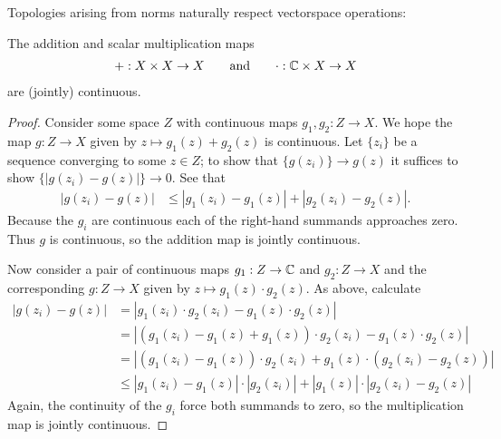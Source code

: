       Topologies arising from norms naturally respect vectorspace operations:
      \begin{claim}
        The addition and scalar multiplication maps 
        \begin{align*}
          +:X\times X\rightarrow X
          \qquad\text{and}\qquad
          \cdot:\mathbb{C}\times X\rightarrow X
        \end{align*}
        are (jointly) continuous.\footnotemark
      \end{claim}
      \begin{proof}
        Consider some space $Z$ with continuous maps $g_1,g_2:Z\rightarrow X$.
        We hope the map $g:Z\rightarrow X$ given by $z\mapsto g_1(z)+g_2(z)$ is continuous.
        Let $\{z_i\}$ be a sequence converging to some $z\in Z$; to show that $\{g(z_i)\}\rightarrow g(z)$ it suffices to show $\{|g(z_i)-g(z)|\}\rightarrow0$.
        See that 
        \begin{align*}
          |g(z_i)-g(z)|
          &\le |g_1(z_i) - g_1(z)| + |g_2(z_i) - g_2(z)|\text{.}
        \end{align*}
        Because the $g_i$ are continuous each of the right-hand summands approaches zero.
        Thus $g$ is continuous, so the addition map is jointly continuous.

        Now consider a pair of continuous maps $g_1:Z\rightarrow\mathbb{C}$ and $g_2:Z\rightarrow X$ and the corresponding $g:Z\rightarrow X$ given by $z\mapsto g_1(z)\cdot g_2(z)$.
        As above, calculate
        \begin{align*}
          |g(z_i)-g(z)|
          &= |g_1(z_i)\cdot g_2(z_i) - g_1(z)\cdot g_2(z)|
          \\&= |(g_1(z_i)-g_1(z)+g_1(z))\cdot g_2(z_i) - g_1(z)\cdot g_2(z)|
          \\&= |(g_1(z_i)-g_1(z))\cdot g_2(z_i) + g_1(z)\cdot(g_2(z_i)-g_2(z))|
          \\&\le |g_1(z_i)-g_1(z)|\cdot|g_2(z_i)| + |g_1(z)|\cdot|g_2(z_i)-g_2(z)|
        \end{align*}
        Again, the continuity of the $g_i$ force both summands to zero, so the multiplication map is jointly continuous.
      \end{proof}

